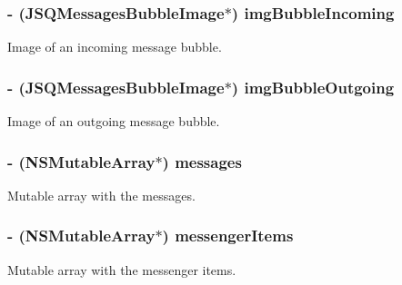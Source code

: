 \subsubsection[{img\+Bubble\+Incoming}]{\setlength{\rightskip}{0pt plus 5cm}-\/ (J\+S\+Q\+Messages\+Bubble\+Image$\ast$) img\+Bubble\+Incoming\hspace{0.3cm}{\ttfamily [protected]}}\label{category_e_s_messenger_view_07_08_a074b59250004158658de40929bcd56c4}
Image of an incoming message bubble. \hypertarget{category_e_s_messenger_view_07_08_a4fe45fd933c5757bca192e741ca58405}{}
\subsubsection[{img\+Bubble\+Outgoing}]{\setlength{\rightskip}{0pt plus 5cm}-\/ (J\+S\+Q\+Messages\+Bubble\+Image$\ast$) img\+Bubble\+Outgoing\hspace{0.3cm}{\ttfamily [protected]}}\label{category_e_s_messenger_view_07_08_a4fe45fd933c5757bca192e741ca58405}
Image of an outgoing message bubble. \hypertarget{category_e_s_messenger_view_07_08_aede1b4ed3fb7cab93c4af78c96cb2c09}{}
\subsubsection[{messages}]{\setlength{\rightskip}{0pt plus 5cm}-\/ (N\+S\+Mutable\+Array$\ast$) messages\hspace{0.3cm}{\ttfamily [protected]}}\label{category_e_s_messenger_view_07_08_aede1b4ed3fb7cab93c4af78c96cb2c09}
Mutable array with the messages. \hypertarget{category_e_s_messenger_view_07_08_a6c95942e4427224197a29849682f374a}{}
\subsubsection[{messenger\+Items}]{\setlength{\rightskip}{0pt plus 5cm}-\/ (N\+S\+Mutable\+Array$\ast$) messenger\+Items\hspace{0.3cm}{\ttfamily [protected]}}\label{category_e_s_messenger_view_07_08_a6c95942e4427224197a29849682f374a}
Mutable array with the messenger items. \hypertarget{category_e_s_messenger_view_07_08_a80d4d7c99145b51c56e260655416ad7b}{}
